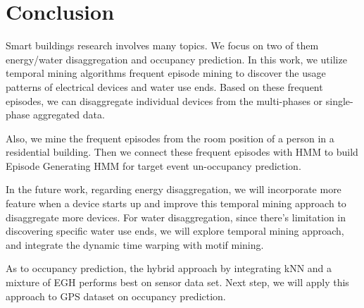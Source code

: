 \chapter{Conclusion}

Smart buildings research involves many topics. 
We focus on two of them energy/water disaggregation and occupancy prediction. 
In this work, we utilize temporal mining algorithms 
frequent episode mining to discover the usage patterns 
of electrical devices and water use ends. 
Based on these frequent episodes, 
we can disaggregate individual devices from the multi-phases 
or single-phase aggregated data. 

Also, we mine the frequent episodes from the room position of a 
person in a residential building. 
Then we connect these frequent episodes with HMM 
to build Episode Generating HMM for target event un-occupancy prediction. 

In the future work, 
regarding energy disaggregation, we will incorporate more feature 
when a device starts up and improve this temporal mining 
approach to disaggregate more devices. 
For water disaggregation, since there's limitation in 
discovering specific water use ends, 
we will explore temporal mining approach, 
and integrate the dynamic time warping with motif mining. 

As to occupancy prediction, 
the hybrid approach by integrating kNN and a mixture of EGH 
performs best on sensor data set. 
Next step, we will apply this approach to GPS dataset 
on occupancy prediction. 

